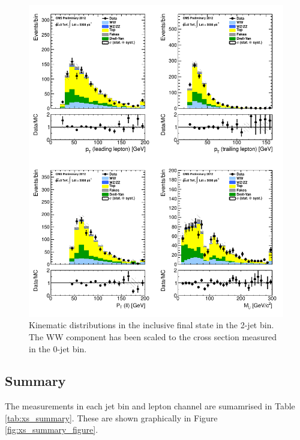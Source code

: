 \begin{figure}[!hbtp]
\centering
\includegraphics[width=1\textwidth]{figures/ww_analysis20_0_ALL_incl_2j.pdf} %
\caption{Kinematic distributions in the inclusive final state in the 2-jet bin.
The WW component has been scaled to the cross section measured in the 0-jet bin.}
\label{fig:xs_kinematics_incl_2j}
\end{figure}

\clearpage
\subsection{Summary}

The measurements in each jet bin and lepton channel are sumamrised in
Table \ref{tab:xs_summary}.  These are shown graphically 
in Figure \ref{fig:xs_summary_figure}.

